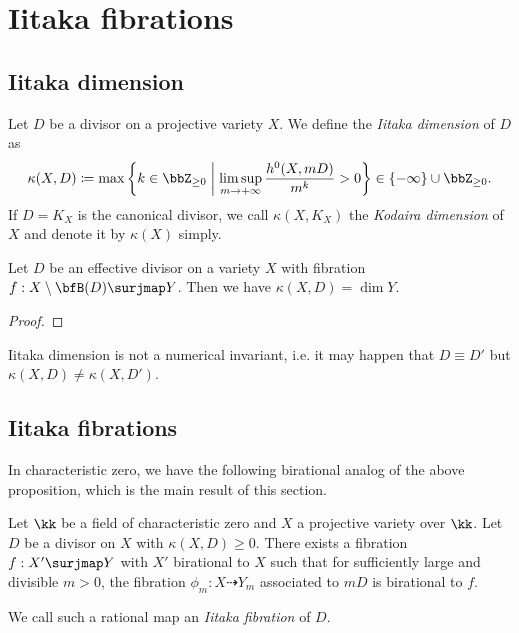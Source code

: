\section{Iitaka fibrations}


\subsection{Iitaka dimension}


  \begin{definition}
    Let $D$ be a divisor on a projective variety $X$.
    We define the \emph{Iitaka dimension} of $D$ as
    \[ \kappa(X, D) \coloneqq \max \left\{ k \in \bbZ_{\geq 0} \;\middle|\; \limsup_{m \to +\infty} \frac{h^0(X, mD)}{m^k} > 0 \right\} \in \{-\infty\} \cup \bbZ_{\geq 0}. \]
    If $D = K_X$ is the canonical divisor, we call $\kappa(X, K_X)$ the \emph{Kodaira dimension} of $X$ and denote it by $\kappa(X)$ simply.
  \end{definition}
  

  \begin{proposition}
    Let $D$ be an effective divisor on a variety $X$ with fibration $f: X \setminus \bfB(D) \surjmap Y$.
    Then we have $\kappa(X, D) = \dim Y$.
  \end{proposition}
  \begin{proof}
    \Yang{}
  \end{proof}

  \begin{remark}
    Iitaka dimension is not a numerical invariant, i.e. it may happen that $D \equiv D'$ but $\kappa(X, D) \neq \kappa(X, D')$.
  \end{remark}



\subsection{Iitaka fibrations}

  In characteristic zero, we have the following birational analog of the above proposition, which is the main result of this section.

  \begin{theorem}
    Let $\kk$ be a field of characteristic zero and $X$ a projective variety over $\kk$.
    Let $D$ be a divisor on $X$ with $\kappa(X, D) \geq 0$.
    There exists a fibration $f: X' \surjmap Y$ with $X'$ birational to $X$ such that for sufficiently large and \Yang{} divisible $m > 0$, the fibration $\phi_m: X \dashrightarrow Y_m$ associated to $mD$ is birational to $f$.

    We call such a rational map an \emph{Iitaka fibration} of $D$.
    \Yang{}
  \end{theorem}

    \Yang{}


